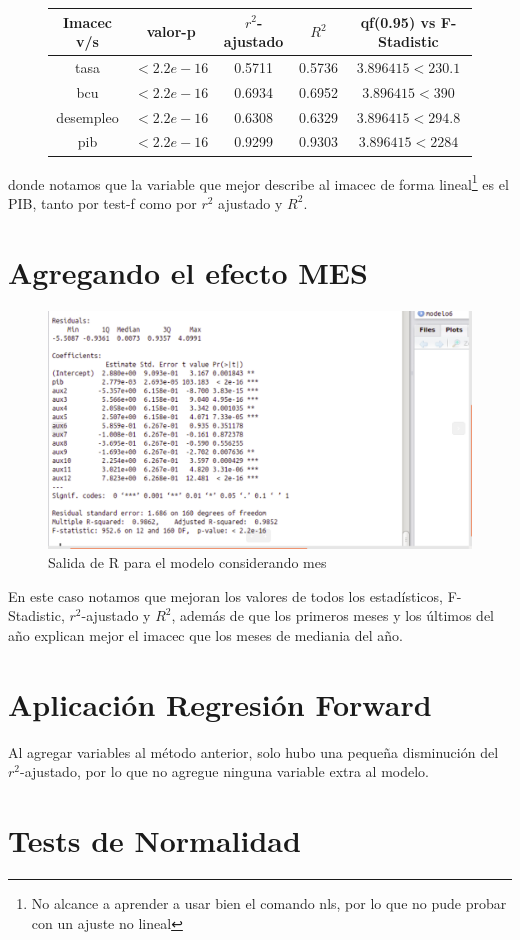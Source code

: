 \documentclass{article}
\begin{document}
\begin{figure}[h!]
\begin{tabular}{|c|c|c|c|c|}
\hline
Imacec v/s & valor-p & $r^{2}$-ajustado& $R^{2}$& qf(0.95) vs F-Stadistic \\
\hline
tasa & $< 2.2e-16$ & 0.5711 & 0.5736&$3.896415<230.1$\\
\hline
bcu & $< 2.2e-16$ &  0.6934  & 0.6952& $3.896415<390$\\
\hline
desempleo & $< 2.2e-16$ & 0.6308  & 0.6329& $3.896415<294.8$\\
\hline
pib & $< 2.2e-16$ & 0.9299 &0.9303&$3.896415<2284$\\
\hline
\end{tabular}

\end{figure}
donde notamos que la variable que mejor describe al imacec de forma lineal\footnote{No alcance a aprender a usar bien el comando nls, por lo que no pude probar con un ajuste no lineal} es el PIB, tanto por test-f como por $r^{2}$ ajustado y  $R^{2}$.


\section*{Agregando el efecto MES}
\begin{figure}[h!]
\centering
\includegraphics[scale=0.5]{./plots/salida_final_R.png}
\caption{Salida de R para el modelo considerando mes}
\end{figure}
En este caso notamos que mejoran los valores de todos los estadísticos, F-Stadistic, $r^{2}$-ajustado y $R^{2}$, además de que los primeros meses y los últimos del año explican mejor el imacec que los meses de mediania del año.
\section*{Aplicación Regresión Forward}
Al agregar variables al método anterior, solo hubo una pequeña disminución del $r^{2}$-ajustado, por lo que no agregue ninguna variable extra al modelo.
\section*{Tests de  Normalidad}
\end{document}
